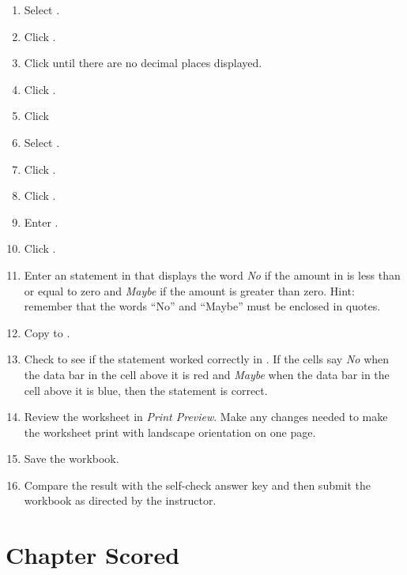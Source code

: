 \begin{enumerate}
	\item Select .
	\item Click .
	\item Click  until there are no decimal places displayed.
	\item Click .
	\item Click  

	\item Select . 
	\item Click .
	
	\item Click . 
	\item Enter . 
	\item Click .
	\item Enter an  statement in that displays the word \textit{No} if the amount in  is less than or equal to zero and \textit{Maybe} if the amount is greater than zero. Hint: remember that the words ``No'' and ``Maybe'' must be enclosed in quotes. 
	\item Copy  to .

	\item Check to see if the  statement worked correctly in . If the cells say \textit{No} when the data bar in the cell above it is red and \textit{Maybe} when the data bar in the cell above it is blue, then the  statement is correct.

	\item Review the worksheet in \textit{Print Preview}. Make any changes needed to make the worksheet print with landscape orientation on one page.

	\item Save the  workbook.
	\item Compare the result with the self-check answer key and then submit the  workbook as directed by the instructor.
\end{enumerate}

\section{Chapter Scored}

